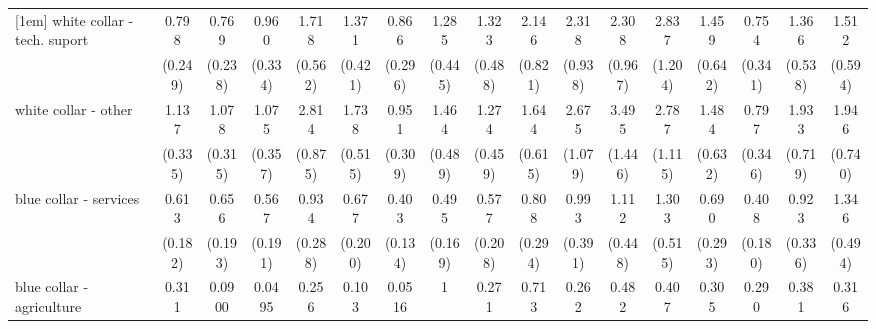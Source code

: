 {\begin{tabular}{l*{16}{c}}
[1em]
white collar - tech. suport&       0.798         &       0.769         &       0.960         &       1.718         &       1.371         &       0.866         &       1.285         &       1.323         &       2.146\sym{*}  &       2.318\sym{*}  &       2.308\sym{*}  &       2.837\sym{*}  &       1.459         &       0.754         &       1.366         &       1.512         \\
                    &     (0.249)         &     (0.238)         &     (0.334)         &     (0.562)         &     (0.421)         &     (0.296)         &     (0.445)         &     (0.488)         &     (0.821)         &     (0.938)         &     (0.967)         &     (1.204)         &     (0.642)         &     (0.341)         &     (0.538)         &     (0.594)         \\
[1em]
white collar - other&       1.137         &       1.078         &       1.075         &       2.814\sym{***}&       1.738         &       0.951         &       1.464         &       1.274         &       1.644         &       2.675\sym{*}  &       3.495\sym{**} &       2.787\sym{*}  &       1.484         &       0.797         &       1.933         &       1.946         \\
                    &     (0.335)         &     (0.315)         &     (0.357)         &     (0.875)         &     (0.515)         &     (0.309)         &     (0.489)         &     (0.459)         &     (0.615)         &     (1.079)         &     (1.446)         &     (1.115)         &     (0.632)         &     (0.346)         &     (0.719)         &     (0.740)         \\
[1em]
blue collar - services&       0.613         &       0.656         &       0.567         &       0.934         &       0.677         &       0.403\sym{**} &       0.495\sym{*}  &       0.577         &       0.808         &       0.993         &       1.112         &       1.303         &       0.690         &       0.408\sym{*}  &       0.923         &       1.346         \\
                    &     (0.182)         &     (0.193)         &     (0.191)         &     (0.288)         &     (0.200)         &     (0.134)         &     (0.169)         &     (0.208)         &     (0.294)         &     (0.391)         &     (0.448)         &     (0.515)         &     (0.293)         &     (0.180)         &     (0.336)         &     (0.494)         \\
[1em]
blue collar - agriculture&       0.311         &      0.0900\sym{**} &      0.0495\sym{**} &       0.256         &       0.103\sym{*}  &      0.0516\sym{**} &           1         &       0.271         &       0.713         &       0.262         &       0.482         &       0.407         &       0.305         &       0.290         &       0.381         &       0.316         \\

\end{tabular}}
